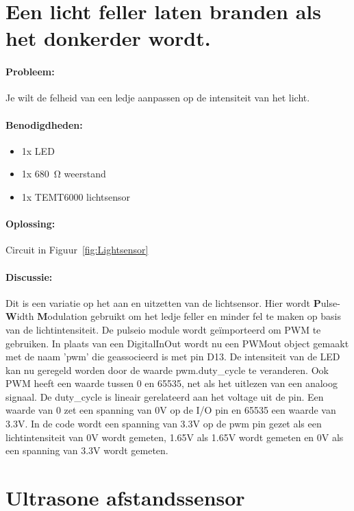 \newpage	
\section{Een licht feller laten branden als het donkerder wordt.}
    \paragraph{Probleem:} Je wilt de felheid van een ledje aanpassen op de intensiteit van het licht.
    \paragraph{Benodigdheden:}
    \begin{itemize}
    	\item 1x LED
    	\item 1x \SI{680}{\ohm} weerstand
    	\item 1x TEMT6000 lichtsensor
    \end{itemize}
    \paragraph{Oplossing:} Circuit in Figuur~\ref{fig:Lightsensor}
		
	\paragraph{Discussie:}
		Dit is een variatie op het aan en uitzetten van de lichtsensor. Hier wordt \textbf{P}ulse-\textbf{W}idth \textbf{M}odulation gebruikt om het ledje feller en minder fel te maken op basis van de lichtintensiteit. De pulseio module wordt ge\"importeerd om PWM te gebruiken. In plaats van een DigitalInOut wordt nu een PWMout object gemaakt met de naam 'pwm' die geassocieerd is met pin D13. De intensiteit van de LED kan nu geregeld worden door de waarde pwm.duty\_cycle te veranderen. Ook PWM heeft een waarde tussen 0 en 65535, net als het uitlezen van een analoog signaal. De duty\_cycle is lineair gerelateerd aan het voltage uit de pin. Een waarde van 0 zet een spanning van 0V op de I/O pin en 65535 een waarde van 3.3V. In de code wordt een spanning van 3.3V op de pwm pin gezet als een lichtintensiteit van 0V wordt gemeten, 1.65V als 1.65V wordt gemeten en 0V als een spanning van 3.3V wordt gemeten.






\newpage
\section{Ultrasone afstandssensor}
